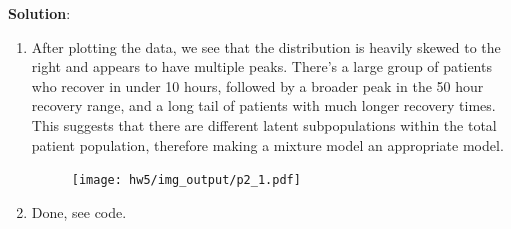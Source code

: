 \documentclass[submit]{../harvardml}
\newenvironment{solution}{
    \vspace{2mm}
    \color{blue}\noindent\textbf{Solution}:
}{}
\begin{document}
\newpage
\begin{solution}
\begin{enumerate}
    \item After plotting the data, we see that the distribution is heavily skewed to the right and appears to have multiple peaks. There’s a large group of patients who recover in under 10 hours, followed by a broader peak in the 50 hour recovery range, and a long tail of patients with much longer recovery times. This suggests that there are different latent subpopulations within the total patient population, therefore making a mixture model an appropriate model. 
 
    \begin{figure}[H]
        \centering
        \texttt{[image: hw5/img\_output/p2\_1.pdf]}
    \end{figure}
    
    \item Done, see code.


\end{enumerate}
\end{solution}
\end{document}

